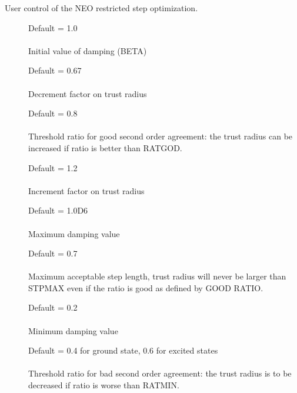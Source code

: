 User control of the NEO restricted step optimization.
 
\begin{description}
\item[]
  Default = 1.0\\
   \\
  Initial value of damping (BETA)
 
\item[]
  Default = 0.67\\
   \\
  Decrement factor on trust radius
 
\item[]
  Default = 0.8 \\
   \\
  Threshold ratio for good second order agreement: the trust radius can
  be increased if ratio is better than RATGOD.
 
\item[]
  Default = 1.2\\
   \\
  Increment factor on trust radius
 
\item[]
  Default = 1.0D6\\
   \\
  Maximum damping value
 
\item[]
  Default = 0.7\\
   \\
  Maximum acceptable step length, trust radius will never be larger than
  STPMAX even if the ratio is good as defined by GOOD RATIO.
 
\item[]
  Default = 0.2\\
   \\
  Minimum damping value

\item[]
  Default = 0.4 for ground state, 0.6 for excited states\\
   \\
  Threshold ratio for bad second order agreement: the trust radius is
  to be decreased if ratio is worse than RATMIN.
 

\end{description}
